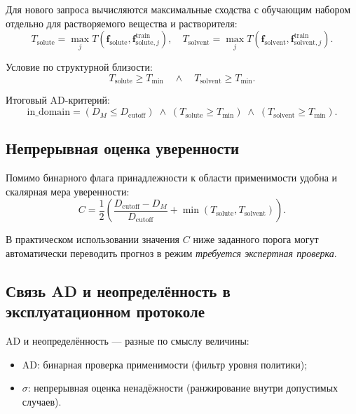 \documentclass[11pt]{article}
\begin{document}
Для нового запроса вычисляются максимальные сходства с обучающим набором отдельно для растворяемого вещества и растворителя:
\begin{equation*}
T_{\mathrm{solute}}=\max_j T(\mathbf{f}_{\mathrm{solute}},\mathbf{f}_{\mathrm{solute},j}^{\mathrm{train}}),
\quad
T_{\mathrm{solvent}}=\max_j T(\mathbf{f}_{\mathrm{solvent}},\mathbf{f}_{\mathrm{solvent},j}^{\mathrm{train}}).
\end{equation*}

Условие по структурной близости:
\begin{equation*}
T_{\mathrm{solute}}\ge T_{\min} \quad \wedge \quad T_{\mathrm{solvent}}\ge T_{\min}.
\end{equation*}

Итоговый AD-критерий:
\begin{equation*}
\mathrm{in\_domain} = (D_M\le D_{\mathrm{cutoff}}) \;\wedge\;
(T_{\mathrm{solute}}\ge T_{\min}) \;\wedge\;
(T_{\mathrm{solvent}}\ge T_{\min}).
\end{equation*}

\subsection{Непрерывная оценка уверенности}

Помимо бинарного флага принадлежности к области применимости удобна и скалярная мера уверенности:
\begin{equation*}
C=\frac{1}{2}\left(
\frac{D_{\mathrm{cutoff}}-D_M}{D_{\mathrm{cutoff}}}+
\min(T_{\mathrm{solute}},T_{\mathrm{solvent}})
\right).
\end{equation*}

В практическом использовании значения $C$ ниже заданного порога могут автоматически переводить прогноз в режим \textit{требуется экспертная проверка}.

\subsection{Связь AD и неопределённость в эксплуатационном протоколе}

AD и неопределённость --- разные по смыслу величины:
\begin{itemize}
  \item AD: бинарная проверка применимости (фильтр уровня политики);
  \item $\sigma$: непрерывная оценка ненадёжности (ранжирование внутри допустимых случаев).
\end{itemize}
\end{document}
